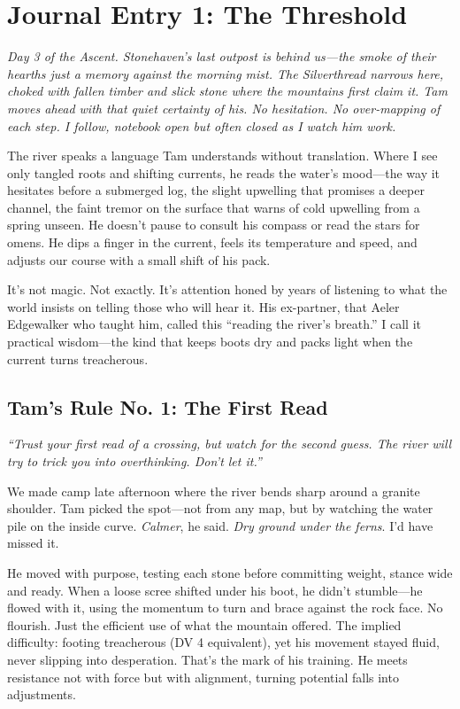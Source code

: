 \documentclass[11pt]{article}
\begin{document}


\section*{Journal Entry 1: The Threshold}
\textit{Day 3 of the Ascent. Stonehaven's last outpost is behind us---the smoke of their hearths just a memory against the morning mist. The Silverthread narrows here, choked with fallen timber and slick stone where the mountains first claim it. Tam moves ahead with that quiet certainty of his. No hesitation. No over-mapping of each step. I follow, notebook open but often closed as I watch him work.}

The river speaks a language Tam understands without translation. Where I see only tangled roots and shifting currents, he reads the water's mood---the way it hesitates before a submerged log, the slight upwelling that promises a deeper channel, the faint tremor on the surface that warns of cold upwelling from a spring unseen. He doesn't pause to consult his compass or read the stars for omens. He dips a finger in the current, feels its temperature and speed, and adjusts our course with a small shift of his pack.

It's not magic. Not exactly. It's attention honed by years of listening to what the world insists on telling those who will hear it. His ex-partner, that Aeler Edgewalker who taught him, called this ``reading the river's breath.'' I call it practical wisdom---the kind that keeps boots dry and packs light when the current turns treacherous.

\subsection*{Tam's Rule No. 1: The First Read}
\textit{``Trust your first read of a crossing, but watch for the second guess. The river will try to trick you into overthinking. Don't let it.''}

We made camp late afternoon where the river bends sharp around a granite shoulder. Tam picked the spot---not from any map, but by watching the water pile on the inside curve. \textit{Calmer}, he said. \textit{Dry ground under the ferns}. I'd have missed it.

He moved with purpose, testing each stone before committing weight, stance wide and ready. When a loose scree shifted under his boot, he didn't stumble---he flowed with it, using the momentum to turn and brace against the rock face. No flourish. Just the efficient use of what the mountain offered. The implied difficulty: footing treacherous (DV 4 equivalent), yet his movement stayed fluid, never slipping into desperation. That's the mark of his training. He meets resistance not with force but with alignment, turning potential falls into adjustments.
\end{document}
